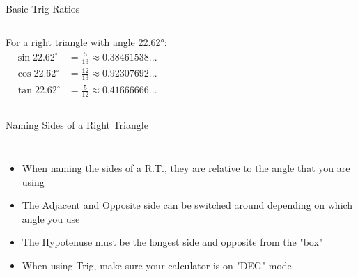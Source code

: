 \documentclass[aspectratio=169]{beamer}
\begin{document}
\begin{frame}{Basic Trig Ratios}
    \begin{tcolorbox}[colback=lightgray,colframe=accent,title=Example]
        \footnotesize
        \begin{columns}
            For a right triangle with angle 22.62°:
            \begin{align*}
                \sin 22.62^\circ &= \frac{5}{13} \approx 0.38461538... \\
                \cos 22.62^\circ &= \frac{12}{13} \approx 0.92307692... \\
                \tan 22.62^\circ &= \frac{5}{12} \approx 0.41666666...
            \end{align*}
        \end{columns}
    \end{tcolorbox}
\end{frame}

\begin{frame}{Naming Sides of a Right Triangle}
    \begin{tcolorbox}[colback=lightgray,colframe=primary,title=Important Notes]
        \footnotesize
        \begin{columns}
            \begin{itemize}
                \item When naming the sides of a R.T., they are relative to the angle that you are using
                \item The Adjacent and Opposite side can be switched around depending on which angle you use
                \item The Hypotenuse must be the longest side and opposite from the "box"
                \item When using Trig, make sure your calculator is on "DEG" mode
            \end{itemize}
        \end{columns}
    \end{tcolorbox}
\end{frame}
\end{document}
